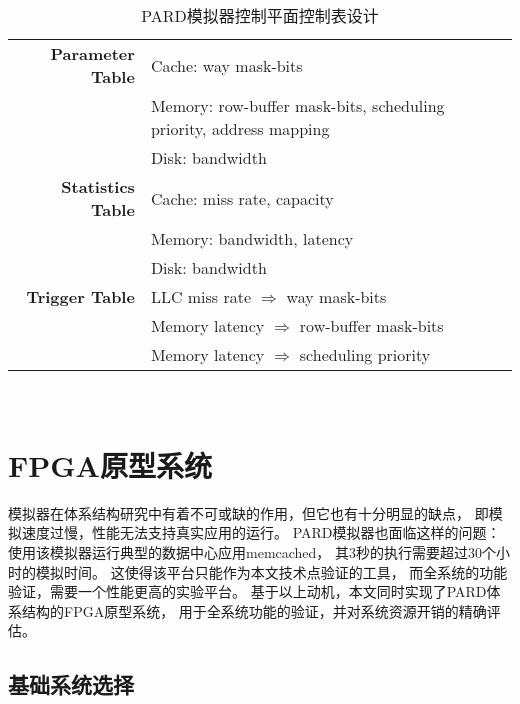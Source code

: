\begin{table}[ht]
  \centering
  \begin{minipage}[t]{0.9\linewidth}
  \caption{PARD模拟器控制平面控制表设计}
  \label{tab:pard-sim-cp}
    \begin{tabular*}{\linewidth}{rl}
      \toprule[1.5pt]
        \textbf{Parameter Table}  &   Cache: way mask-bits                               \\
                                  &   Memory: row-buffer mask-bits, scheduling priority, address mapping \\
                                  &   Disk: bandwidth                                    \\
        \hline
        \textbf{Statistics Table} &   Cache: miss rate, capacity                         \\
                                  &   Memory: bandwidth, latency                         \\
                                  &   Disk: bandwidth                                    \\
        \hline
        \textbf{Trigger Table}    &   LLC miss rate $\Rightarrow$ way mask-bits          \\
                                  &   Memory latency $\Rightarrow$ row-buffer mask-bits  \\
                                  &   Memory latency $\Rightarrow$ scheduling priority   \\
      \bottomrule[1.5pt]
    \end{tabular*}\\[2pt]
  \end{minipage}
\end{table}


\section{FPGA原型系统}

模拟器在体系结构研究中有着不可或缺的作用，但它也有十分明显的缺点，
即模拟速度过慢，性能无法支持真实应用的运行。
PARD模拟器也面临这样的问题：
使用该模拟器运行典型的数据中心应用memcached，
其3秒的执行需要超过30个小时的模拟时间。
这使得该平台只能作为本文技术点验证的工具，
而全系统的功能验证，需要一个性能更高的实验平台。
基于以上动机，本文同时实现了PARD体系结构的FPGA原型系统，
用于全系统功能的验证，并对系统资源开销的精确评估。

\subsection{基础系统选择}

